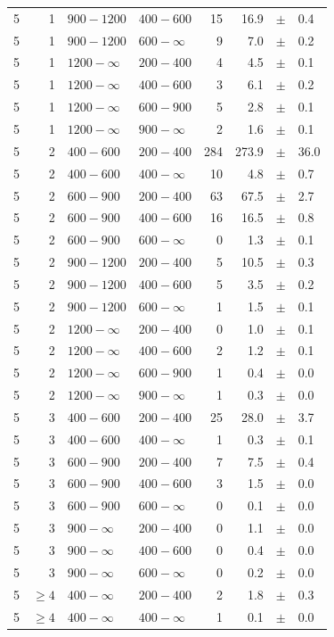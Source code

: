\begin{table}[!h]
\begin{tabular}{rrllrrcl}
5 & 1 & $ 900-1200$ & $400-600$ &     15 &     16.9 &$\pm$&    0.4 \\
5 & 1 & $ 900-1200$ & $600-\infty$ &      9 &      7.0 &$\pm$&    0.2 \\
5\T & 1 & $1200- \infty$ & $200-400$ &      4 &      4.5 &$\pm$&    0.1 \\
5 & 1 & $1200- \infty$ & $400-600$ &      3 &      6.1 &$\pm$&    0.2 \\
5 & 1 & $1200- \infty$ & $600-900$ &      5 &      2.8 &$\pm$&    0.1 \\
5 & 1 & $1200- \infty$ & $900-\infty$ &      2 &      1.6 &$\pm$&    0.1 \\
5\T & 2 & $ 400- 600$ & $200-400$ &    284 &    273.9 &$\pm$&   36.0 \\
5 & 2 & $ 400- 600$ & $400-\infty$ &     10 &      4.8 &$\pm$&    0.7 \\
5\T & 2 & $ 600- 900$ & $200-400$ &     63 &     67.5 &$\pm$&    2.7 \\
5 & 2 & $ 600- 900$ & $400-600$ &     16 &     16.5 &$\pm$&    0.8 \\
5 & 2 & $ 600- 900$ & $600-\infty$ &      0 &      1.3 &$\pm$&    0.1 \\
5\T & 2 & $ 900-1200$ & $200-400$ &      5 &     10.5 &$\pm$&    0.3 \\
5 & 2 & $ 900-1200$ & $400-600$ &      5 &      3.5 &$\pm$&    0.2 \\
5 & 2 & $ 900-1200$ & $600-\infty$ &      1 &      1.5 &$\pm$&    0.1 \\
5\T & 2 & $1200- \infty$ & $200-400$ &      0 &      1.0 &$\pm$&    0.1 \\
5 & 2 & $1200- \infty$ & $400-600$ &      2 &      1.2 &$\pm$&    0.1 \\
5 & 2 & $1200- \infty$ & $600-900$ &      1 &      0.4 &$\pm$&    0.0 \\
5 & 2 & $1200- \infty$ & $900-\infty$ &      1 &      0.3 &$\pm$&    0.0 \\
5\T & 3 & $ 400- 600$ & $200-400$ &     25 &     28.0 &$\pm$&    3.7 \\
5 & 3 & $ 400- 600$ & $400-\infty$ &      1 &      0.3 &$\pm$&    0.1 \\
5\T & 3 & $ 600- 900$ & $200-400$ &      7 &      7.5 &$\pm$&    0.4 \\
5 & 3 & $ 600- 900$ & $400-600$ &      3 &      1.5 &$\pm$&    0.0 \\
5 & 3 & $ 600- 900$ & $600-\infty$ &      0 &      0.1 &$\pm$&    0.0 \\
5\T & 3 & $ 900- \infty$ & $200-400$ &      0 &      1.1 &$\pm$&    0.0 \\
5 & 3 & $ 900- \infty$ & $400-600$ &      0 &      0.4 &$\pm$&    0.0 \\
5 & 3 & $ 900- \infty$ & $600-\infty$ &      0 &      0.2 &$\pm$&    0.0 \\
5\T & $\geq 4$ & $ 400- \infty$ & $200-400$ &      2 &      1.8 &$\pm$&    0.3 \\
5 & $\geq 4$ & $ 400- \infty$ & $400-\infty$ &      1 &      0.1 &$\pm$&    0.0 \\
    \hline
  \end{tabular}
\end{table}

